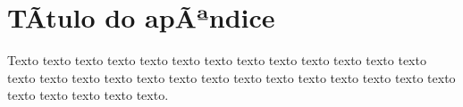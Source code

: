 \chapter{TÃ­tulo do apÃªndice}
\label{cap:ape}

Texto texto texto texto texto texto texto texto texto texto texto texto texto
texto texto texto texto texto texto texto texto texto texto texto texto texto
texto texto texto texto texto texto.

